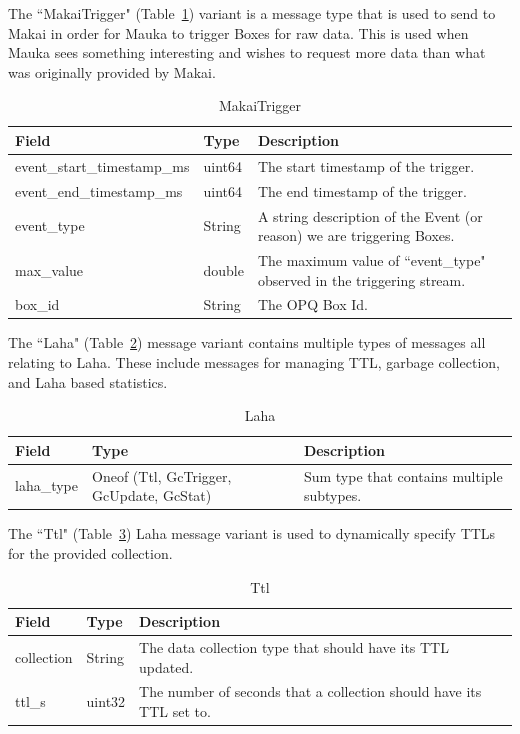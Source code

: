 The ``MakaiTrigger" (Table~\ref{table:MakaiTrigger}) variant is a message type that is used to send to Makai in order for Mauka to trigger Boxes for raw data. This is used when Mauka sees something interesting and wishes to request more data than what was originally provided by Makai.

\begin{table}[H]
	\centering
	\caption{MakaiTrigger}
	\begin{tabularx}{\textwidth}{llX}
		\toprule
		\textbf{Field} & \textbf{Type} & \textbf{Description} \\
		\midrule
		event\_start\_timestamp\_ms & uint64  & The start timestamp of the trigger. \\
		event\_end\_timestamp\_ms & uint64 & The end timestamp of the trigger. \\
		event\_type & String & A string description of the Event (or reason) we are triggering Boxes. \\
		max\_value & double & The maximum value of ``event\_type" observed in the triggering stream. \\
		box\_id & String & The OPQ Box Id. \\
		\bottomrule
	\end{tabularx}
	\label{table:MakaiTrigger}
\end{table}

The ``Laha" (Table~\ref{table:Laha}) message variant contains multiple types of messages all relating to Laha. These include messages for managing TTL, garbage collection, and Laha based statistics.

\begin{table}[H]
	\centering
	\caption{Laha}
	\begin{tabularx}{\textwidth}{lXX}
		\toprule
		\textbf{Field} & \textbf{Type} & \textbf{Description} \\
		\midrule
		laha\_type & Oneof (Ttl, GcTrigger, GcUpdate, GcStat) & Sum type that contains multiple subtypes. \\
		\bottomrule
	\end{tabularx}
	\label{table:Laha}
\end{table}

The ``Ttl" (Table~\ref{table:Ttl}) Laha message variant is used to dynamically specify TTLs for the provided collection.

\begin{table}[H]
	\centering
	\caption{Ttl}
	\begin{tabularx}{\textwidth}{llX}
		\toprule
		\textbf{Field} & \textbf{Type} & \textbf{Description} \\
		\midrule
		collection & String & The data collection type that should have its TTL updated.  \\
		ttl\_s & uint32 & The number of seconds that a collection should have its TTL set to. \\
		\bottomrule
	\end{tabularx}
	\label{table:Ttl}
\end{table}

